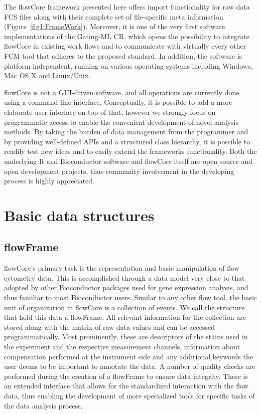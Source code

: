 \documentclass[12pt]{article}
\begin{document}
The flowCore framework presented here offers import functionality for
raw data FCS files along with their complete set of file-specific meta
information (Figure~\ref{fig1:FrameWork}).  Moreover, it is one of the very first software
implementations of the Gating-ML CR, which opens the possibility to
integrate flowCore in existing work flows and to communicate with
virtually every other FCM tool that adheres to the proposed
standard. In addition, the software is platform independent, running
on various operating systems including Windows, Mac OS X and
Linux/Unix.

flowCore is not a GUI-driven software, and all operations are
currently done using a command line interface. Conceptually, it is
possible to add a more elaborate user interface on top of that,
however we strongly focus on programmatic access to enable the
convenient development of novel analysis methods. By taking the burden
of data management from the programmer and by providing well-defined
APIs and a structured class hierarchy, it is possible to readily test
new ideas and to easily extend the frameworks functionality. Both the
underlying R and Bioconductor software and flowCore itself are open
source and open development projects, thus community involvement in the
developing process is highly appreciated.



\section*{Basic data structures}
\subsection*{flowFrame}
flowCore's primary task is the representation and basic manipulation
of flow cytometry data. This is accomplished through a data model very
close to that adopted by other Bioconductor packages used for gene
expression analysis, and thus familiar to most Bioconductor
users. Similar to any other flow tool, the basic unit of organization
in flowCore is a collection of events. We call the structure that hold
this data a flowFrame. All relevant information for the collection are
stored along with the matrix of raw data values and can be accessed
programmatically. Most prominently, these are descriptors of the
stains used in the experiment and the respective measurement channels,
information about compensation performed at the instrument side and
any additional keywords the user deems to be important to annotate the
data. A number of quality checks are performed during the creation of
a flowFrame to ensure data integrity. There is an extended interface
that allows for the standardized interaction with the flow data, thus
enabling the development of more specialized tools for specific tasks
of the data analysis process.
\end{document}
